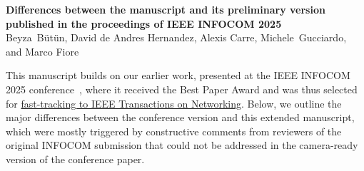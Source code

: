\documentclass[onecolumn,letter,10pt]{article}
\begin{document}
\thispagestyle{empty}

{\centering
    {\LARGE\bfseries Differences between the manuscript and its preliminary version published in the proceedings of IEEE INFOCOM 2025}\\\vspace*{0.5cm}
    \normalsize 
		Beyza~B\"{u}t\"{u}n, David de Andres Hernandez, Alexis Carre, Michele~Gucciardo, and Marco Fiore\vspace*{0.1cm}\\
}
		
\vspace*{1\baselineskip}





\noindent This manuscript builds on our earlier work, presented at the IEEE INFOCOM 2025 conference~\cite{DUNE}, where it received the Best Paper Award and was thus selected for \ul{fast-tracking to IEEE Transactions on Networking}. Below, we outline the major differences between the conference version and this extended manuscript, which were mostly triggered by constructive comments from reviewers of the original INFOCOM submission that could not be addressed in the camera-ready version of the conference paper.
\end{document}

